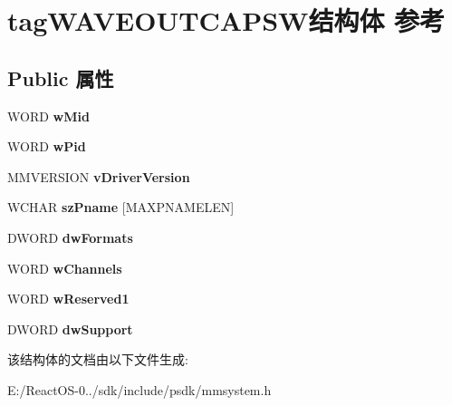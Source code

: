 \hypertarget{structtag_w_a_v_e_o_u_t_c_a_p_s_w}{}\section{tag\+W\+A\+V\+E\+O\+U\+T\+C\+A\+P\+S\+W结构体 参考}
\label{structtag_w_a_v_e_o_u_t_c_a_p_s_w}
\subsection*{Public 属性}
\begin{DoxyCompactItemize}
\item 
\mbox{\label{structtag_w_a_v_e_o_u_t_c_a_p_s_w_a404d46a1306df0ebd96a0beeba3cafb9}} 
W\+O\+RD {\bfseries w\+Mid}
\item 
\mbox{\label{structtag_w_a_v_e_o_u_t_c_a_p_s_w_a9045e127eddd7b54416c715a647aacaa}} 
W\+O\+RD {\bfseries w\+Pid}
\item 
\mbox{\label{structtag_w_a_v_e_o_u_t_c_a_p_s_w_a00b8b59c673aa0200caeac6c27314604}} 
M\+M\+V\+E\+R\+S\+I\+ON {\bfseries v\+Driver\+Version}
\item 
\mbox{\label{structtag_w_a_v_e_o_u_t_c_a_p_s_w_a049c4db2048681b31261356755375aa1}} 
W\+C\+H\+AR {\bfseries sz\+Pname} \mbox{[}M\+A\+X\+P\+N\+A\+M\+E\+L\+EN\mbox{]}
\item 
\mbox{\label{structtag_w_a_v_e_o_u_t_c_a_p_s_w_a1ca48ec686e23b11cbee0b5542910e6e}} 
D\+W\+O\+RD {\bfseries dw\+Formats}
\item 
\mbox{\label{structtag_w_a_v_e_o_u_t_c_a_p_s_w_ad4cc682ca0ddda6493f41c336e2949df}} 
W\+O\+RD {\bfseries w\+Channels}
\item 
\mbox{\label{structtag_w_a_v_e_o_u_t_c_a_p_s_w_aa578d18b93f458b5126a7118853f7e9a}} 
W\+O\+RD {\bfseries w\+Reserved1}
\item 
\mbox{\label{structtag_w_a_v_e_o_u_t_c_a_p_s_w_a9bf58c9f3e155bca4e9eea2c0d54f4b5}} 
D\+W\+O\+RD {\bfseries dw\+Support}
\end{DoxyCompactItemize}


该结构体的文档由以下文件生成\+:\begin{DoxyCompactItemize}
\item 
E\+:/\+React\+O\+S-\/0../sdk/include/psdk/mmsystem.\+h\end{DoxyCompactItemize}
